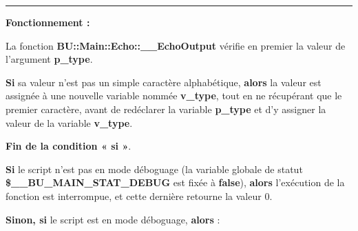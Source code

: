 \documentclass[a4paper,10pt]{article}
\begin{document}
\setlength{\parskip}{2em}


\par\noindent\rule{\textwidth}{0.4pt}\setlength{\parskip}{1em}

\begin{justify}
    \textbf{Fonctionnement :}

    La fonction \textbf{\color{func}BU::Main::Echo::\_\_EchoOutput} vérifie en premier la valeur de l'argument \textbf{\color{vars}p\_type}.
\end{justify}

\begin{justify}
    \textbf{\color{cond}Si} sa valeur n'est pas un simple caractère alphabétique, \textbf{\color{cond}alors} la valeur est assignée à une nouvelle variable nommée \textbf{\color{vars}v\_type}, tout en ne récupérant que le premier caractère, avant de redéclarer la variable \textbf{\color{vars}p\_type} et d'y assigner la valeur de la variable \textbf{\color{vars}v\_type}.
\end{justify}

\begin{justify}
    \textbf{\color{cond}Fin de la condition « si »}.
\end{justify}

\setlength{\parskip}{2em}


\begin{justify}
    \textbf{\color{cond}Si} le script n'est pas en mode déboguage (la variable globale de statut \textbf{\color{vars}\$\_\_BU\_MAIN\_STAT\_DEBUG} est fixée à \textbf{false}), \textbf{\color{cond}alors} l'exécution de la fonction est interrompue, et cette dernière retourne la valeur 0.
\end{justify}

\setlength{\parskip}{1em}

\begin{justify}
    \textbf{\color{cond}Sinon, si} le script est en mode déboguage, \textbf{\color{cond}alors} :
\end{justify}
\end{document}
